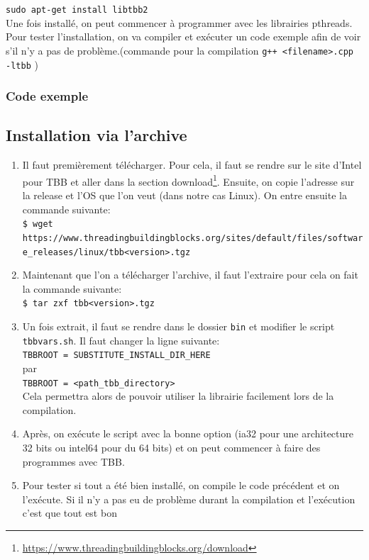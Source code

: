 \documentclass[10pt,a4paper]{article}
\begin{document}
\texttt{sudo apt-get install libtbb2}\\

Une fois installé, on peut commencer à programmer avec les librairies pthreads. Pour tester l'installation, on va compiler et exécuter un code exemple afin de voir s'il n'y a pas de problème.(commande pour la compilation \texttt{g++ <filename>.cpp -ltbb} )

\subsubsection{Code exemple}


\newpage

\subsection{Installation via l'archive}

\begin{enumerate}

	\item Il faut premièrement télécharger. Pour cela, il faut se rendre sur le site d'Intel pour TBB et aller dans la section download\footnote{\url{https://www.threadingbuildingblocks.org/download}}. Ensuite, on copie l'adresse sur la release et l'OS que l'on veut (dans notre cas Linux). On entre ensuite la commande suivante:\\
	\texttt{\$ wget https://www.threadingbuildingblocks.org/sites/default/files/\linebreak software\_releases/linux/tbb<version>.tgz}
	
	\item Maintenant que l'on a télécharger l'archive, il faut l'extraire pour cela on fait la commande suivante:\\
	\texttt{\$ tar zxf tbb<version>.tgz}
	\item Un fois extrait, il faut se rendre dans le dossier \texttt{bin} et modifier le script \texttt{tbbvars.sh}. Il faut changer la ligne suivante:\\
	\texttt{TBBROOT = SUBSTITUTE\_INSTALL\_DIR\_HERE} \\
	par\\
	\texttt{TBBROOT = <path\_tbb\_directory>}\\
	Cela permettra alors de pouvoir utiliser la librairie facilement lors de la compilation.
	\item Après, on exécute le script avec la bonne option (ia32 pour une architecture 32 bits ou intel64 pour du 64 bits) et on peut commencer à faire des programmes avec TBB.
	\item Pour tester si tout a été bien installé, on compile le code précédent et on l'exécute.
	Si il n'y a pas eu de problème durant la compilation et l'exécution c'est que tout est bon
\end{enumerate}
\end{document}
